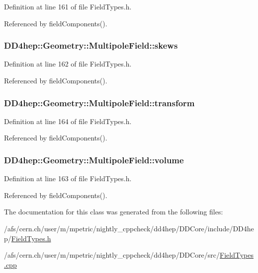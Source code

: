 Definition at line 161 of file FieldTypes.h.

Referenced by fieldComponents().\hypertarget{class_d_d4hep_1_1_geometry_1_1_multipole_field_a52a44a6298e89815f17e1c271b7644d2}{
\subsubsection[{skews}]{ {\bf DD4hep::Geometry::MultipoleField::skews}}}
\label{class_d_d4hep_1_1_geometry_1_1_multipole_field_a52a44a6298e89815f17e1c271b7644d2}


Definition at line 162 of file FieldTypes.h.

Referenced by fieldComponents().\hypertarget{class_d_d4hep_1_1_geometry_1_1_multipole_field_aa4040740a5339e8dc1f1d7e65187ea0e}{
\subsubsection[{transform}]{ {\bf DD4hep::Geometry::MultipoleField::transform}}}
\label{class_d_d4hep_1_1_geometry_1_1_multipole_field_aa4040740a5339e8dc1f1d7e65187ea0e}


Definition at line 164 of file FieldTypes.h.

Referenced by fieldComponents().\hypertarget{class_d_d4hep_1_1_geometry_1_1_multipole_field_a6ff1c10d2c4b9a47db39b466e45de63a}{
\subsubsection[{volume}]{ {\bf DD4hep::Geometry::MultipoleField::volume}}}
\label{class_d_d4hep_1_1_geometry_1_1_multipole_field_a6ff1c10d2c4b9a47db39b466e45de63a}


Definition at line 163 of file FieldTypes.h.

Referenced by fieldComponents().

The documentation for this class was generated from the following files:\begin{DoxyCompactItemize}
\item 
/afs/cern.ch/user/m/mpetric/nightly\_\-cppcheck/dd4hep/DDCore/include/DD4hep/\hyperlink{_field_types_8h}{FieldTypes.h}\item 
/afs/cern.ch/user/m/mpetric/nightly\_\-cppcheck/dd4hep/DDCore/src/\hyperlink{_field_types_8cpp}{FieldTypes.cpp}\end{DoxyCompactItemize}
